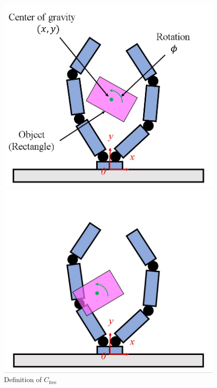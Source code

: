 \documentclass[a4paper,twoside,12pt,papersize, dvipdfmx]{iirthesis}
\begin{document}
\begin{figure}[b]
\begin{minipage}{0.5\hsize}
\centering
\includegraphics[width=0.9\hsize]{fig/2-sensorless-icm/define_cfree.jpg}
\end{minipage}
\begin{minipage}{0.5\hsize}
\centering
\includegraphics[width=0.9\hsize]{fig/2-sensorless-icm/define_notcfree.jpg}
\end{minipage}
\caption{Definition of $C_{\mathrm{free}}$}
\label{fig::sicm::cfree}
\end{figure}

\end{document}
